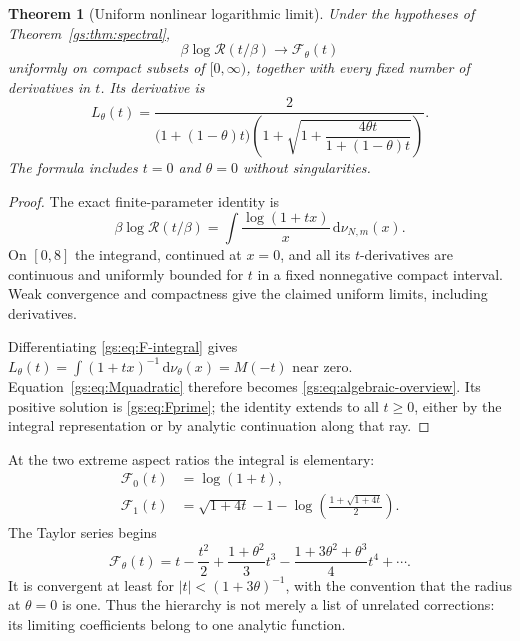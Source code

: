 \documentclass[11pt,a4paper]{article}
\numberwithin{equation}{section}
\newtheorem{theorem}{Theorem}[section]
\theoremstyle{definition}
\theoremstyle{remark}
\newcommand{\dd}{\mathrm d}
\newcommand{\Rgs}{\mathcal R}
\newcommand{\calF}{\mathcal F}
\begin{document}
\begin{theorem}[Uniform nonlinear logarithmic limit]\label{gs:thm:freeenergy}
Under the hypotheses of Theorem~\ref{gs:thm:spectral},
\begin{equation}\label{gs:eq:F-limit}
 \beta\log\Rgs(t/\beta)\longrightarrow\calF_\theta(t)
\end{equation}
uniformly on compact subsets of $[0,\infty)$, together with every fixed
number of derivatives in $t$. Its derivative is
\begin{equation}\label{gs:eq:Fprime}
 L_\theta(t)=
 \frac{2}{\bigl(1+(1-\theta)t\bigr)
 \left(1+\sqrt{1+\dfrac{4\theta t}{1+(1-\theta)t}}\right)}.
\end{equation}
The formula includes $t=0$ and $\theta=0$ without singularities.
\end{theorem}
\begin{proof}
The exact finite-parameter identity is
\begin{equation}\label{gs:eq:F-exact}
 \beta\log\Rgs(t/\beta)
 =\int\frac{\log(1+tx)}x\,\dd\nu_{N,m}(x).
\end{equation}
On $[0,8]$ the integrand, continued at $x=0$, and all its $t$-derivatives
are continuous and uniformly bounded for $t$ in a fixed nonnegative
compact interval. Weak convergence and compactness give the claimed
uniform limits, including derivatives.

Differentiating \eqref{gs:eq:F-integral} gives
$L_\theta(t)=\int(1+tx)^{-1}\,\dd\nu_\theta(x)=M(-t)$ near zero.
Equation~\eqref{gs:eq:Mquadratic} therefore becomes
\eqref{gs:eq:algebraic-overview}. Its positive solution is
\eqref{gs:eq:Fprime}; the identity extends to all $t\ge0$, either by the
integral representation or by analytic continuation along that ray.
\end{proof}

At the two extreme aspect ratios the integral is elementary:
\begin{align}\label{gs:eq:extreme-F}
 \calF_0(t)&=\log(1+t),\\
 \calF_1(t)&=\sqrt{1+4t}-1-
       \log\!\left(\frac{1+\sqrt{1+4t}}2\right).
\end{align}
The Taylor series begins
\begin{equation}\label{gs:eq:Fseries}
 \calF_\theta(t)=t-\frac{t^2}{2}
       +\frac{1+\theta^2}{3}t^3
       -\frac{1+3\theta^2+\theta^3}{4}t^4+\cdots.
\end{equation}
It is convergent at least for $|t|<(1+3\theta)^{-1}$, with the convention
that the radius at $\theta=0$ is one. Thus the hierarchy is not merely a
list of unrelated corrections: its limiting coefficients belong to one
analytic function.
\end{document}
